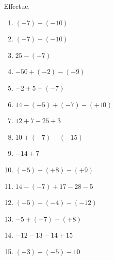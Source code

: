 %
%
    Effectue.
    \begin{enumerate}[cols=3, itemsep=1em]
        \item $(-7)+(-10)$
        \item $( + 7) + ( - 10)$
        \item $25 - ( + 7)$
        \item $-50+(-2)-(-9)$
        \item $-2+5-(-7)$
        \item $14-(-5)+(-7)-(+10)$
        \item $12 + 7 - 25 + 3$
        \item $10 + ( - 7) - ( - 15)$
        \item $- 14 + 7$
        \item $( - 5) + ( + 8) - ( + 9)$
        \item $14 - ( - 7) + 17 - 28 - 5$
        \item $( - 5) + ( - 4) - ( - 12)$
        \item $- 5 + ( - 7) - ( + 8)$
        \item $- 12 - 13 - 14 + 15$
        \item $(-3)- (-5) - 10$
    \end{enumerate}
